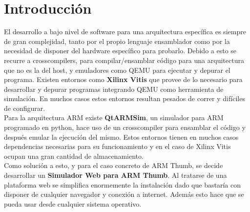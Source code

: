\section{Introducción}
{
    El desarrollo a bajo nivel de software para una arquitectura específica es siempre de gran complejidad, tanto por el propio lenguaje ensamblador como por la necesidad de disponer del hardware
    específico para probarlo. Debido a esto se recurre a crosscompilers, para compilar/ensamblar código para una arquitectura que no es la del host, y emuladores como QEMU para ejecutar y depurar el programa.
    Existen entornos como \textbf{Xilinx Vitis} que provee de lo necesario para desarrollar y depurar programas integrando QEMU como herramienta de simulación.
    En muchos casos estos entornos resultan pesados de correr y difíciles de configurar. \\

    Para la arquitectura ARM existe \textbf{QtARMSim}, un simulador para ARM programado en python, hace uso de un crosscompiler para ensamblar el código y después emular la ejecución del mismo.
    Estos entornos tienen en muchos casos dependencias necesarias para su funcionamiento y en el caso de Xilinx Vitis ocupan una gran cantidad de almacenamiento. \\
    

    Como solución a esto, y para el caso concreto de ARM Thumb, se decide desarrollar un \textbf{Simulador Web para ARM Thumb}.
    Al tratarse de una plataforma web se simplifica enormemente la instalación dado que bastaría con disponer de cualquier navegador y conexión a internet. Además esto hace que se pueda usar desde cualquier sistema operativo. \\
    
}
